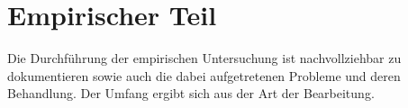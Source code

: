 

\chapter{Empirischer Teil} \label{cha:designAndDevelopment}

Die Durchführung der empirischen Untersuchung ist nachvollziehbar zu dokumentieren sowie auch die dabei aufgetretenen Probleme und deren Behandlung.
Der Umfang ergibt sich aus der Art der Bearbeitung. 




